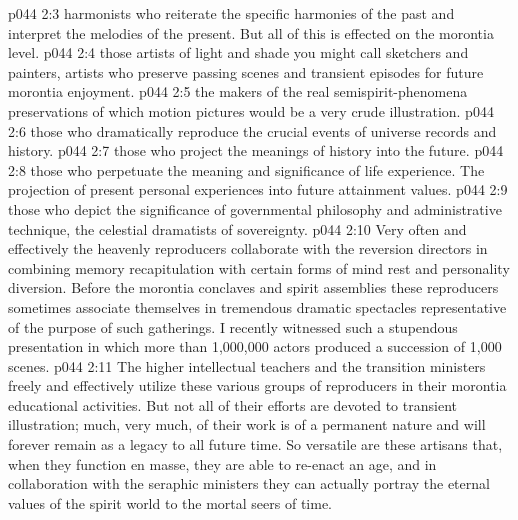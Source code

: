 \vs p044 2:3 \bibnobreakspace {} harmonists who reiterate the specific harmonies of the past and interpret the melodies of the present. But all of this is effected on the morontia level.
\vs p044 2:4 \bibnobreakspace {} those artists of light and shade you might call sketchers and painters, artists who preserve passing scenes and transient episodes for future morontia enjoyment.
\vs p044 2:5 \bibnobreakspace {} the makers of the real semispirit\hyp{}phenomena preservations of which motion pictures would be a very crude illustration.
\vs p044 2:6 \bibnobreakspace {} those who dramatically reproduce the crucial events of universe records and history.
\vs p044 2:7 \bibnobreakspace {} those who project the meanings of history into the future.
\vs p044 2:8 \bibnobreakspace {} those who perpetuate the meaning and significance of life experience. The projection of present personal experiences into future attainment values.
\vs p044 2:9 \bibnobreakspace {} those who depict the significance of governmental philosophy and administrative technique, the celestial dramatists of sovereignty.
\vs p044 2:10 \pc Very often and effectively the heavenly reproducers collaborate with the reversion directors in combining memory recapitulation with certain forms of mind rest and personality diversion. Before the morontia conclaves and spirit assemblies these reproducers sometimes associate themselves in tremendous dramatic spectacles representative of the purpose of such gatherings. I recently witnessed such a stupendous presentation in which more than 1,000,000 actors produced a succession of 1,000 scenes.
\vs p044 2:11 The higher intellectual teachers and the transition ministers freely and effectively utilize these various groups of reproducers in their morontia educational activities. But not all of their efforts are devoted to transient illustration; much, very much, of their work is of a permanent nature and will forever remain as a legacy to all future time. So versatile are these artisans that, when they function en masse, they are able to re\hyp{}enact an age, and in collaboration with the seraphic ministers they can actually portray the eternal values of the spirit world to the mortal seers of time.
